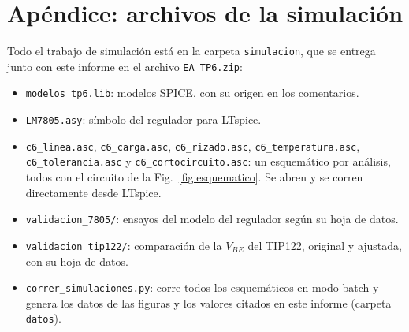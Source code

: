 \section*{Apéndice: archivos de la simulación}
Todo el trabajo de simulación está en la carpeta \texttt{simulacion}, que se entrega junto con este informe en el archivo \texttt{EA\_TP6.zip}:
\begin{itemize}
    \item \texttt{modelos\_tp6.lib}: modelos SPICE, con su origen en los comentarios.
    \item \texttt{LM7805.asy}: símbolo del regulador para LTspice.
    \item \texttt{c6\_linea.asc}, \texttt{c6\_carga.asc}, \texttt{c6\_rizado.asc}, \texttt{c6\_temperatura.asc}, \texttt{c6\_tolerancia.asc} y \texttt{c6\_cortocircuito.asc}: un esquemático por análisis, todos con el circuito de la Fig.~\ref{fig:esquematico}. Se abren y se corren directamente desde LTspice.
    \item \texttt{validacion\_7805/}: ensayos del modelo del regulador según su hoja de datos.
    \item \texttt{validacion\_tip122/}: comparación de la $V_{BE}$ del TIP122, original y ajustada, con su hoja de datos.
    \item \texttt{correr\_simulaciones.py}: corre todos los esquemáticos en modo batch y genera los datos de las figuras y los valores citados en este informe (carpeta \texttt{datos}).
\end{itemize}
